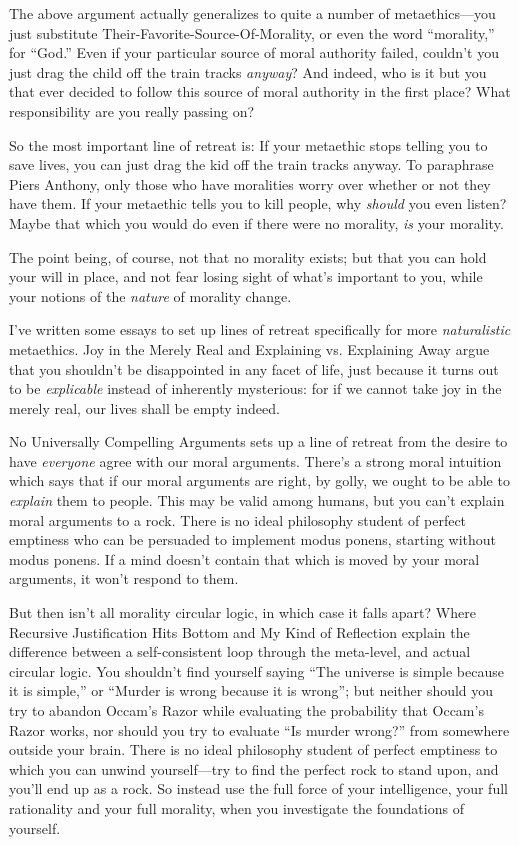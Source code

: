{
 The above argument actually generalizes to quite a number of
metaethics---you just substitute Their-Favorite-Source-Of-Morality, or
even the word ``morality,'' for
``God.'' Even if your particular
source of moral authority failed, couldn't you just
drag the child off the train tracks \textit{anyway}? And indeed, who is
it but you that ever decided to follow this source of moral authority
in the first place? What responsibility are you really passing on?}

{
 So the most important line of retreat is: If your metaethic stops
telling you to save lives, you can just drag the kid off the train
tracks anyway. To paraphrase Piers Anthony, only those who have
moralities worry over whether or not they have them. If your metaethic
tells you to kill people, why \textit{should} you even listen? Maybe
that which you would do even if there were no morality, \textit{is}
your morality.}

{
 The point being, of course, not that no morality exists; but that
you can hold your will in place, and not fear losing sight of
what's important to you, while your notions of the
\textit{nature} of morality change.}

{
 I've written some essays to set up lines of
retreat specifically for more \textit{naturalistic} metaethics. Joy in
the Merely Real and Explaining vs. Explaining Away argue that you
shouldn't be disappointed in any facet of life, just
because it turns out to be \textit{explicable} instead of inherently
mysterious: for if we cannot take joy in the merely real, our lives
shall be empty indeed.}

{
 No Universally Compelling Arguments sets up a line of retreat from
the desire to have \textit{everyone} agree with our moral arguments.
There's a strong moral intuition which says that if our
moral arguments are right, by golly, we ought to be able to
\textit{explain} them to people. This may be valid among humans, but
you can't explain moral arguments to a rock. There is
no ideal philosophy student of perfect emptiness who can be persuaded
to implement modus ponens, starting without modus ponens. If a mind
doesn't contain that which is moved by your moral
arguments, it won't respond to them.}

{
 But then isn't all morality circular logic, in
which case it falls apart? Where Recursive Justification Hits Bottom
and My Kind of Reflection explain the difference between a
self-consistent loop through the meta-level, and actual circular logic.
You shouldn't find yourself saying
``The universe is simple because it is
simple,'' or ``Murder is wrong
because it is wrong''; but neither should you try to
abandon Occam's Razor while evaluating the probability
that Occam's Razor works, nor should you try to
evaluate ``Is murder wrong?'' from
somewhere outside your brain. There is no ideal philosophy student of
perfect emptiness to which you can unwind yourself---try to find the
perfect rock to stand upon, and you'll end up as a
rock. So instead use the full force of your intelligence, your full
rationality and your full morality, when you investigate the
foundations of yourself.}

